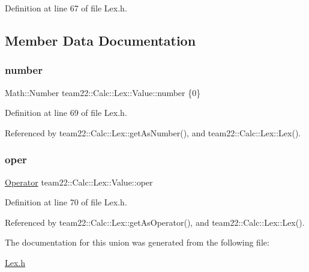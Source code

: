 Definition at line 67 of file Lex.\+h.



\subsection{Member Data Documentation}
\mbox{\label{unionteam22_1_1_calc_1_1_lex_1_1_value_a86e2e3ea0c887ca50885bcdb8f1ec5ce}} 
\subsubsection{\texorpdfstring{number}{number}}
{\footnotesize\ttfamily Math\+::\+Number team22\+::\+Calc\+::\+Lex\+::\+Value\+::number \{0\}}



Definition at line 69 of file Lex.\+h.



Referenced by team22\+::\+Calc\+::\+Lex\+::get\+As\+Number(), and team22\+::\+Calc\+::\+Lex\+::\+Lex().

\mbox{\label{unionteam22_1_1_calc_1_1_lex_1_1_value_ade46fa860d495ce4d431d3934210579d}} 
\subsubsection{\texorpdfstring{oper}{oper}}
{\footnotesize\ttfamily \hyperlink{classteam22_1_1_calc_1_1_lex_a61d29fc4878a3b36d2de2f13c56ed932}{Operator} team22\+::\+Calc\+::\+Lex\+::\+Value\+::oper}



Definition at line 70 of file Lex.\+h.



Referenced by team22\+::\+Calc\+::\+Lex\+::get\+As\+Operator(), and team22\+::\+Calc\+::\+Lex\+::\+Lex().



The documentation for this union was generated from the following file\+:\begin{DoxyCompactItemize}
\item 
\hyperlink{_lex_8h}{Lex.\+h}\end{DoxyCompactItemize}
